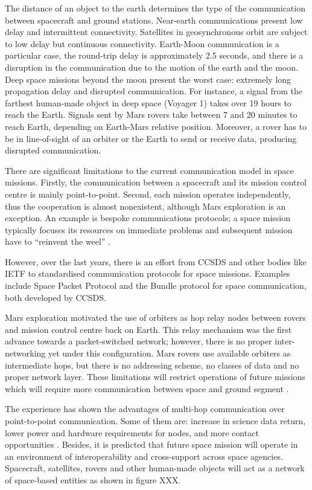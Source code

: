 The distance of an object to the earth determines the type of the communication between spacecraft and ground stations. Near-earth communications present low delay and intermittent connectivity. Satellites in geosynchronous orbit are subject to low delay but continuous connectivity. Earth-Moon communication is a particular case, the round-trip delay is approximately 2.5 seconds, and there is a disruption in the communication due to the motion of the earth and the moon. Deep space missions beyond the moon present the worst case: extremely long propagation delay and disrupted communication. For instance,  a signal from the farthest human-made object in deep space (Voyager 1) takes over 19 hours to reach the Earth. Signals sent by Mars rovers take between 7 and 20 minutes to reach Earth, depending on Earth-Mars relative position. Moreover, a rover has to be in line-of-sight of an orbiter or the Earth to send or receive data, producing disrupted communication. 



There are significant limitations to the current communication model in space missions. Firstly,  the communication between a spacecraft and its mission control centre is mainly point-to-point. Second, each mission operates independently, thus the cooperation is almost nonexistent, although Mars exploration is an exception. An example is bespoke communications protocols; a space mission typically focuses its resources on immediate problems and subsequent mission have to ``reinvent the weel'' \cite{burleigh2003interplanetary}. 

However, over the last years, there is an effort from CCSDS and other bodies like IETF to standardised communication protocols for space missions. Examples include Space Packet Protocol and the Bundle protocol for space communication, both developed by CCSDS.%

Mars exploration motivated the use of orbiters as hop relay nodes between rovers and mission control centre back on Earth. This relay mechanism was the first advance towards a packet-switched network; however, there is no proper inter-networking yet under this configuration. Mars rovers use available orbiters as intermediate hops, but there is no addressing scheme, no classes of data and no proper network layer. These limitations will restrict operations of future missions which will require more communication between space and ground segment \cite{rationale2010requirements}. 


The experience has shown the advantages of multi-hop communication over point-to-point communication. Some of them are: increase in science data return, lower power and hardware requirements for nodes, and more contact opportunities \cite{rationale2010requirements}. Besides, it is predicted that future space mission will operate in an environment of interoperability and cross-support across space agencies. Spacecraft, satellites, rovers and other human-made objects will act as a network of space-based entities as shown in figure XXX.




